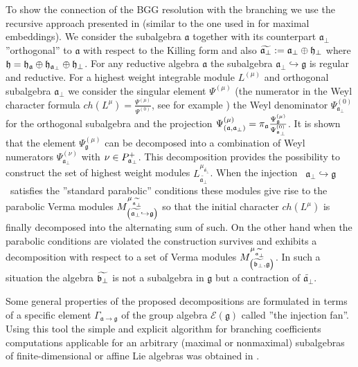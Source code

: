 \documentclass[12pt]{article}
\theoremstyle{definition}
\newcommand{\gf}{\mathfrak{g}}
\newcommand{\af}{\mathfrak{a}}
\newcommand{\afb}{\mathfrak{a}_{\bot}}
\begin{document}
To show the connection of the BGG resolution with the branching we use the recursive approach presented in \cite
{2010arXiv1007.0318L} (similar to the one used in \cite{ilyin812pbc} for
maximal embeddings). We consider the subalgebra $\af$ together with its
counterpart $\afb$ ''orthogonal'' to $\af$ with respect to
the Killing form and also $\widetilde{\afb}:=\afb\oplus \frak{h}_{\perp }$ where $\frak{h}=\frak{\frak{h}_{\af}}\oplus
\frak{h}_{\afb}\oplus \frak{h}_{\perp }$. For any reductive
algebra $\af$ the subalgebra $\afb\hookrightarrow \gf$
is regular and reductive. For a highest weight integrable module $%
L^{\left(\mu \right) }$ and orthogonal subalgebra $\af_{\bot }$ we
consider the singular element $\Psi ^{\left( \mu \right) }$ (the numerator
in the Weyl character formula $ch\left( L^{\mu }\right) =\frac{\Psi ^{\left(
\mu \right) }}{\Psi ^{\left( 0\right) }}$, see for example \cite
{humphreys1997introduction}) the Weyl denominator $\Psi _{\af_{\bot
}}^{\left( 0\right) }$ for the orthogonal subalgebra and the projection $%
\Psi _{\left( \af,\af_{\bot }\right) }^{\left( \mu \right) }=\pi _{%
\af}\frac{\Psi _{\gf}^{\left( \mu \right) }}{\Psi _{\af_{\bot
}}^{\left( 0\right) }}$. It is shown that the element $\Psi _{\gf%
}^{\left( \mu \right) }$ can be decomposed into a combination of Weyl
numerators $\Psi _{\af_{\bot }}^{\left( \nu \right) }$ with $\nu \in P_{%
\mathfrak{a}_{\bot}}^{+}$. This decomposition provides the possibility to
construct the set of highest weight modules $L_{\widetilde{\afb}%
}^{\mu _{\widetilde{\afb}}}$. When the injection \ $\af%
_{\bot }\hookrightarrow \gf$ \ satisfies the ''standard parabolic''
conditions these modules give rise to the parabolic Verma modules $M_{\left(
\widetilde{\afb}\hookrightarrow \gf\right) }^{\mu _{%
\widetilde{\afb}}}$ so that the initial character $ch\left(
L^{\mu }\right) $ is finally decomposed into the alternating sum of such. On
the other hand when the parabolic conditions are violated the construction
survives and exhibits a decomposition with respect to a set of Verma
modules $M_{\left( \widetilde{\frak{b}_{\perp }},\gf\right) }^{\mu _{%
\widetilde{\afb}}}$. In such a situation the algebra $%
\widetilde{\frak{b}_{\perp }}$ is not a subalgebra in $\gf$ but a
contraction of $\widetilde{\afb}$.

Some general properties of the proposed decompositions are formulated in
terms of a specific element $\Gamma _{\af\rightarrow \gf}$ of the
group algebra $\mathcal{E}\left( \gf\right) $ called ''the injection
fan''. Using this tool the simple and explicit algorithm for branching
coefficients computations applicable for an arbitrary (maximal or
nonmaximal) subalgebras of finite-dimensional or affine Lie algebras was
obtained in \cite{2010arXiv1007.0318L}.
\end{document}
